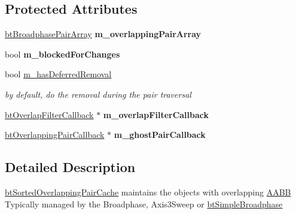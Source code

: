\subsection*{Protected Attributes}
\begin{DoxyCompactItemize}
\item 
\hypertarget{classbt_sorted_overlapping_pair_cache_acaa927894c7124575a41316d29ff9d3b}{\hyperlink{classbt_aligned_object_array}{bt\+Broadphase\+Pair\+Array} {\bfseries m\+\_\+overlapping\+Pair\+Array}}\label{classbt_sorted_overlapping_pair_cache_acaa927894c7124575a41316d29ff9d3b}

\item 
\hypertarget{classbt_sorted_overlapping_pair_cache_a20f04b05ae9f4fe1fcaed54b5738fc5c}{bool {\bfseries m\+\_\+blocked\+For\+Changes}}\label{classbt_sorted_overlapping_pair_cache_a20f04b05ae9f4fe1fcaed54b5738fc5c}

\item 
\hypertarget{classbt_sorted_overlapping_pair_cache_aaf79926dc15005b65c34248053af42b9}{bool \hyperlink{classbt_sorted_overlapping_pair_cache_aaf79926dc15005b65c34248053af42b9}{m\+\_\+has\+Deferred\+Removal}}\label{classbt_sorted_overlapping_pair_cache_aaf79926dc15005b65c34248053af42b9}

\begin{DoxyCompactList}\small\item\em by default, do the removal during the pair traversal \end{DoxyCompactList}\item 
\hypertarget{classbt_sorted_overlapping_pair_cache_a712d09d20f5b707361287199779c9350}{\hyperlink{structbt_overlap_filter_callback}{bt\+Overlap\+Filter\+Callback} $\ast$ {\bfseries m\+\_\+overlap\+Filter\+Callback}}\label{classbt_sorted_overlapping_pair_cache_a712d09d20f5b707361287199779c9350}

\item 
\hypertarget{classbt_sorted_overlapping_pair_cache_a784af49bd9507729fe72fca2fe489f0a}{\hyperlink{classbt_overlapping_pair_callback}{bt\+Overlapping\+Pair\+Callback} $\ast$ {\bfseries m\+\_\+ghost\+Pair\+Callback}}\label{classbt_sorted_overlapping_pair_cache_a784af49bd9507729fe72fca2fe489f0a}

\end{DoxyCompactItemize}


\subsection{Detailed Description}
\hyperlink{classbt_sorted_overlapping_pair_cache}{bt\+Sorted\+Overlapping\+Pair\+Cache} maintains the objects with overlapping \hyperlink{class_a_a_b_b}{A\+A\+B\+B} Typically managed by the Broadphase, Axis3\+Sweep or \hyperlink{classbt_simple_broadphase}{bt\+Simple\+Broadphase} 

